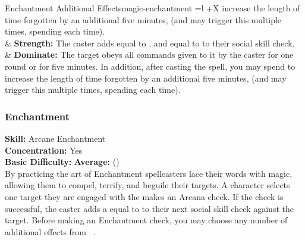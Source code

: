 \begin{table*}[!htb]
\begin{GenesysTable}{Enchantment Additional Effects}{magic-enchantment}{ =l +X}
                            increase the length of time forgotten by an additional
                            five minutes, (and may trigger this multiple times,
                            spending \advantage each time).\\
\difficulty\difficulty  & \textbf{Strength:} The caster adds \success equal to \success,
                            and \advantage equal to \advantage to their social
                            skill check.\\
\difficulty\difficulty  & \textbf{Dominate:} The target obeys all commands given to it by
                            the caster for one round or for five minutes. In
                            addition, after casting the spell, you may spend \advantage
                            to increase the length of time forgotten by an
                            additional five minutes, (and may trigger this
                            multiple times, spending \advantage each time).\\
\end{GenesysTable}
\end{table*}

\subsubsection{Enchantment}
\textbf{Skill:} Arcane Enchantment\\
\textbf{Concentration:} Yes\\
\textbf{Basic Difficulty:} \textbf{Average:} (\difficulty\difficulty)\\
By practicing the art of Enchantment spellcasters lace their words with magic,
allowing them to compel, terrify, and beguile their targets. A character selects
one target they are engaged with the makes an Arcana check. If the check is
successful, the caster adds a equal to \advantage to their next social skill
check against the target. Before making an Enchantment check, you may choose
any number of additional effects from ~.

